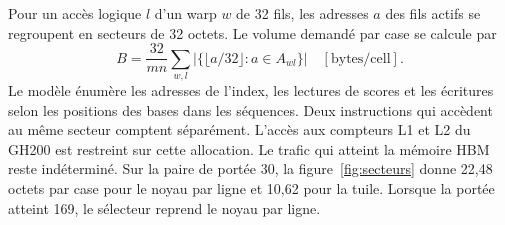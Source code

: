 Pour un accès logique \(l\) d'un warp \(w\) de 32 fils, les adresses \(a\) des fils actifs se regroupent en secteurs de 32 octets. Le volume demandé par case se calcule par
\[
 B=\frac{32}{mn}\sum_{w,l}\bigl|\{\lfloor a/32\rfloor : a\in A_{wl}\}\bigr|
 \quad [\mathrm{bytes/cell}].
\]
Le modèle énumère les adresses de l'index, les lectures de scores et les écritures selon les positions des bases dans les séquences. Deux instructions qui accèdent au même secteur comptent séparément. L'accès aux compteurs L1 et L2 du GH200 est restreint sur cette allocation. Le trafic qui atteint la mémoire HBM reste indéterminé.
Sur la paire de portée 30, la figure~\ref{fig:secteurs} donne 22,48 octets par case pour le noyau par ligne et 10,62 pour la tuile. Lorsque la portée atteint 169, le sélecteur reprend le noyau par ligne.


